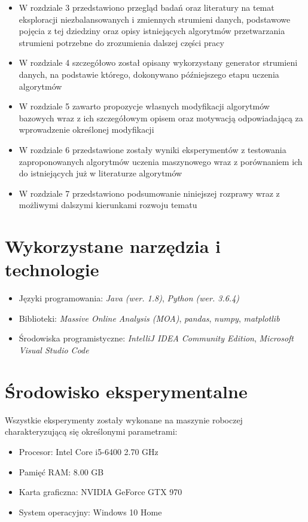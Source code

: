 \begin{itemize}
    \item W rozdziale 3 przedstawiono przegląd badań oraz literatury na temat eksploracji niezbalansowanych i zmiennych strumieni danych, podstawowe pojęcia z tej dziedziny oraz opisy istniejących algorytmów przetwarzania strumieni potrzebne do zrozumienia dalszej części pracy
    \item W rozdziale 4 szczegółowo został opisany wykorzystany generator strumieni danych, na podstawie którego, dokonywano późniejszego etapu uczenia algorytmów
    \item W rozdziale 5 zawarto propozycje własnych modyfikacji algorytmów bazowych wraz z ich szczegółowym opisem oraz motywacją odpowiadającą za wprowadzenie określonej modyfikacji
    \item W rozdziale 6 przedstawione zostały wyniki eksperymentów z testowania zaproponowanych algorytmów uczenia maszynowego wraz z porównaniem ich do istniejących już w literaturze algorytmów
    \item W rozdziale 7 przedstawiono podsumowanie niniejszej rozprawy wraz z możliwymi dalszymi kierunkami rozwoju tematu
\end{itemize}

\section{Wykorzystane narzędzia i technologie}

\begin{itemize}
    \item Języki programowania: \textit{Java (wer. 1.8)}, \textit{Python (wer. 3.6.4)}
    \item Biblioteki: \textit{Massive Online Analysis (MOA)}\cite{Article:MOA}, \textit{pandas}, \textit{numpy}, \textit{matplotlib}
    \item Środowiska programistyczne: \textit{IntelliJ IDEA Community Edition}, \textit{Microsoft Visual Studio Code}
\end{itemize}

\section{Środowisko eksperymentalne}

\noindent Wszystkie eksperymenty zostały wykonane na maszynie roboczej charakteryzującą się określonymi parametrami:

\begin{itemize}
    \item Procesor: Intel Core i5-6400 2.70 GHz
    \item Pamięć RAM: 8.00 GB
    \item Karta graficzna: NVIDIA GeForce GTX 970
    \item System operacyjny: Windows 10 Home
\end{itemize}
